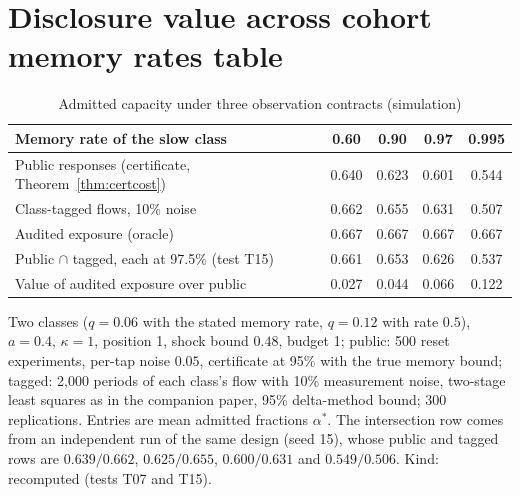 \documentclass[12pt]{article}
\theoremstyle{definition}
\theoremstyle{remark}
\begin{document}
\section{Disclosure value across cohort memory rates table}
\FloatBarrier
\begin{table}[t]\centering\small
\begin{threeparttable}
\caption{Admitted capacity under three observation contracts (simulation)}\label{tab:discsim}
\begin{tabular}{lcccc}
\toprule
Memory rate of the slow class & 0.60 & 0.90 & 0.97 & 0.995\\
\midrule
Public responses (certificate, Theorem~\ref{thm:certcost}) & 0.640 & 0.623 & 0.601 & 0.544\\
Class-tagged flows, 10\% noise & 0.662 & 0.655 & 0.631 & 0.507\\
Audited exposure (oracle) & 0.667 & 0.667 & 0.667 & 0.667\\
Public $\cap$ tagged, each at 97.5\% (test T15) & 0.661 & 0.653 & 0.626 & 0.537\\
\midrule
Value of audited exposure over public & 0.027 & 0.044 & 0.066 & 0.122\\
\bottomrule
\end{tabular}
\begin{tablenotes}\footnotesize\item Two classes ($q=0.06$ with the stated memory rate, $q=0.12$ with rate $0.5$), $a=0.4$, $\kappa=1$, position 1, shock bound $0.48$, budget 1; public: 500 reset experiments, per-tap noise $0.05$, certificate at 95\% with the true memory bound; tagged: 2{,}000 periods of each class's flow with 10\% measurement noise, two-stage least squares as in the companion paper, 95\% delta-method bound; 300 replications. Entries are mean admitted fractions $\alpha^*$. The intersection row comes from an independent run of the same design (seed 15), whose public and tagged rows are $0.639/0.662$, $0.625/0.655$, $0.600/0.631$ and $0.549/0.506$. Kind: recomputed (tests T07 and T15).\end{tablenotes}
\end{threeparttable}
\end{table}
\FloatBarrier
\end{document}
